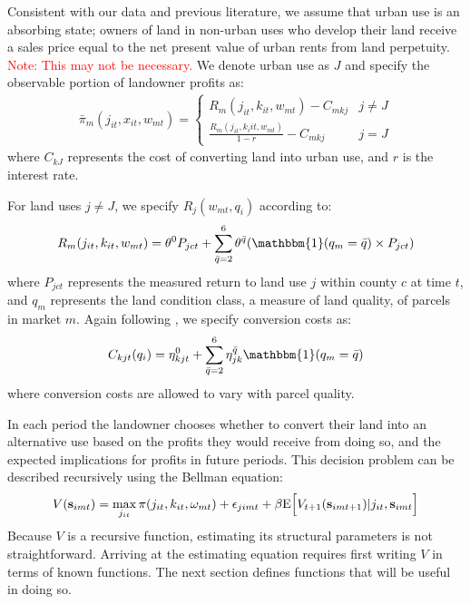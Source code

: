 \documentclass[11pt]{article}
\newcommand{\Exp}{\textnormal{E}}
\begin{document}
Consistent with our data and previous literature, we assume that urban use is an absorbing state; owners of land in non-urban uses who develop their land receive a sales price equal to the net present value of urban rents from land perpetuity. \textcolor{red}{Note: This may not be necessary.} We denote urban use as $J$ and specify the observable portion of landowner profits as:
\begin{align} \label{eq:pidefn}
\bar{\pi}_m(j_{it},x_{it},w_{mt}) = \left\{\begin{array}{ll} 
	R_{m}(j_{it},k_{it}, w_{mt}) - C_{mkj} & j\neq J \\
	\frac{R_{m}(j_{it},k_i{it}, w_{mt})}{1-r} - C_{mkj} & j = J
	\end{array}\right.
\end{align}
where $C_{kJ}$ represents the cost of converting land into urban use, and $r$ is the interest rate.

For land uses $j \neq J$, we specify $R_{j}(w_{mt},q_{i})$ according to:
\begin{align} \label{eq:rentspec}
R_{m}(j_{it},k_{it}, w_{mt}) = \theta^0 P_{jct} + \sum_{\bar{q} = 2}^6 \theta^{\bar{q}} (\mathbbm{1}(q_{m} = \bar{q}) \times P_{jct} )
\end{align}
where $P_{jct}$ represents the measured return to land use $j$ within county $c$ at time $t$, and $q_{m}$ represents the land condition class, a measure of land quality, of parcels in market $m$. Again following \citet{lubowski2006}, we specify conversion costs as: 
\begin{align} \label{eq:costspec}
C_{kjt}(q_i) = \eta^0_{kjt} + \sum_{\bar{q} = 2}^6 \eta^{\bar{q}}_{jk} \mathbbm{1}(q_{m} = \bar{q}) 
\end{align}
where conversion costs are allowed to vary with parcel quality.

In each period the landowner chooses whether to convert their land into an alternative use based on the profits they would receive from doing so, and the expected implications for profits in future periods. This decision problem can be described recursively using the Bellman equation:
\begin{align}
V({\bf s}_{imt}) = \max_{j_{it}} \pi(j_{it},k_{it},\omega_{mt}) + \epsilon_{jimt} + \beta \Exp\Big[V_{t+1}({\bf s}_{imt+1})|j_{it},{\bf s}_{imt}\Big]
\end{align}
Because $V$ is a recursive function, estimating its structural parameters is not straightforward. Arriving at the estimating equation requires first writing $V$ in terms of known functions. The next section defines functions that will be useful in doing so.
\end{document}
